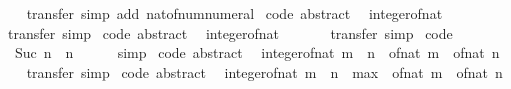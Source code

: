 \begin{isabellebody}
%
\isadelimproof
\ \ %
\endisadelimproof
%
\isatagproof
{}\isamarkupfalse%
\ transfer\ {\isacharparenleft}simp\ add{\isacharcolon}\ nat{\isacharunderscore}of{\isacharunderscore}num{\isacharunderscore}numeral{\isacharparenright}%
\endisatagproof
{\isafoldproof}%
%
\isadelimproof
\isanewline
%
\endisadelimproof
\isanewline
{}\isamarkupfalse%
\ {\isacharbrackleft}code\ abstract{\isacharbrackright}{\isacharcolon}\isanewline
\ \ {\isachardoublequoteopen}integer{\isacharunderscore}of{\isacharunderscore}nat\ {}\ {\isacharequal}\ {}{\isachardoublequoteclose}\isanewline
%
\isadelimproof
\ \ %
\endisadelimproof
%
\isatagproof
{}\isamarkupfalse%
\ transfer\ simp%
\endisatagproof
{\isafoldproof}%
%
\isadelimproof
\isanewline
%
\endisadelimproof
\isanewline
{}\isamarkupfalse%
\ {\isacharbrackleft}code\ abstract{\isacharbrackright}{\isacharcolon}\isanewline
\ \ {\isachardoublequoteopen}integer{\isacharunderscore}of{\isacharunderscore}nat\ {}\ {\isacharequal}\ {}{\isachardoublequoteclose}\isanewline
%
\isadelimproof
\ \ %
\endisadelimproof
%
\isatagproof
{}\isamarkupfalse%
\ transfer\ simp%
\endisatagproof
{\isafoldproof}%
%
\isadelimproof
\isanewline
%
\endisadelimproof
\isanewline
{}\isamarkupfalse%
\ {\isacharbrackleft}code{\isacharbrackright}{\isacharcolon}\isanewline
\ \ {\isachardoublequoteopen}Suc\ n\ {\isacharequal}\ n\ {\isacharplus}\ {}{\isachardoublequoteclose}\isanewline
%
\isadelimproof
\ \ %
\endisadelimproof
%
\isatagproof
{}\isamarkupfalse%
\ simp%
\endisatagproof
{\isafoldproof}%
%
\isadelimproof
\isanewline
%
\endisadelimproof
\isanewline
{}\isamarkupfalse%
\ {\isacharbrackleft}code\ abstract{\isacharbrackright}{\isacharcolon}\isanewline
\ \ {\isachardoublequoteopen}integer{\isacharunderscore}of{\isacharunderscore}nat\ {\isacharparenleft}m\ {\isacharplus}\ n{\isacharparenright}\ {\isacharequal}\ of{\isacharunderscore}nat\ m\ {\isacharplus}\ of{\isacharunderscore}nat\ n{\isachardoublequoteclose}\isanewline
%
\isadelimproof
\ \ %
\endisadelimproof
%
\isatagproof
{}\isamarkupfalse%
\ transfer\ simp%
\endisatagproof
{\isafoldproof}%
%
\isadelimproof
\isanewline
%
\endisadelimproof
\isanewline
{}\isamarkupfalse%
\ {\isacharbrackleft}code\ abstract{\isacharbrackright}{\isacharcolon}\isanewline
\ \ {\isachardoublequoteopen}integer{\isacharunderscore}of{\isacharunderscore}nat\ {\isacharparenleft}m\ {\isacharminus}\ n{\isacharparenright}\ {\isacharequal}\ max\ {}\ {\isacharparenleft}of{\isacharunderscore}nat\ m\ {\isacharminus}\ of{\isacharunderscore}nat\ n{\isacharparenright}{\isachardoublequoteclose}\isanewline

\end{isabellebody}
